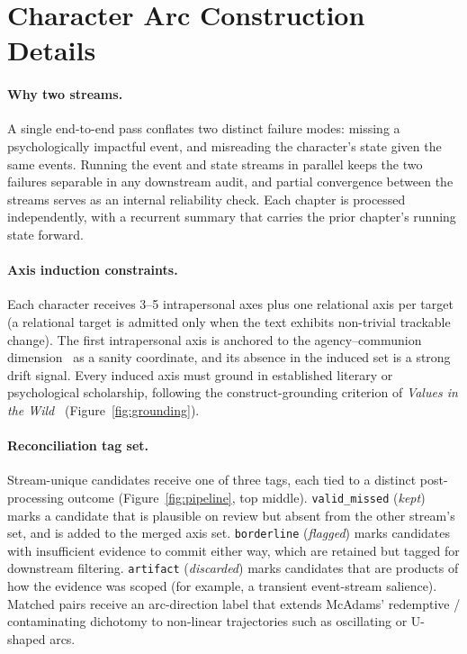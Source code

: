 \documentclass{llmxive}
\begin{document}




\appendix

\section{Character Arc Construction Details\label{app:arc-details}}

\paragraph{Why two streams.}
A single end-to-end pass conflates two distinct failure modes: missing a psychologically impactful event, and misreading the character's state given the same events. Running the event and state streams in parallel keeps the two failures separable in any downstream audit, and partial convergence between the streams serves as an internal reliability check. Each chapter is processed independently, with a recurrent summary that carries the prior chapter's running state forward.

\paragraph{Axis induction constraints.}
Each character receives 3--5 intrapersonal axes plus one relational axis per target (a relational target is admitted only when the text exhibits non-trivial trackable change). The first intrapersonal axis is anchored to the agency--communion dimension~\cite{Mcadams1999, Mcadams2013} as a sanity coordinate, and its absence in the induced set is a strong drift signal. Every induced axis must ground in established literary or psychological scholarship, following the construct-grounding criterion of \emph{Values in the Wild}~\cite{huang2025values} (Figure~\ref{fig:grounding}).

\paragraph{Reconciliation tag set.}
Stream-unique candidates receive one of three tags, each tied to a distinct post-processing outcome (Figure~\ref{fig:pipeline}, top middle). \texttt{valid\_missed} (\emph{kept}) marks a candidate that is plausible on review but absent from the other stream's set, and is added to the merged axis set. \texttt{borderline} (\emph{flagged}) marks candidates with insufficient evidence to commit either way, which are retained but tagged for downstream filtering. \texttt{artifact} (\emph{discarded}) marks candidates that are products of how the evidence was scoped (for example, a transient event-stream salience). Matched pairs receive an arc-direction label that extends McAdams' redemptive / contaminating dichotomy to non-linear trajectories such as oscillating or U-shaped arcs.
\end{document}
